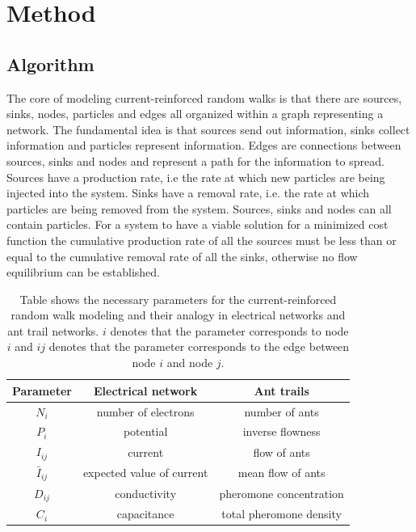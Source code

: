 \section{Method}
\label{sec:method}
\subsection{Algorithm}
The core of modeling current-reinforced random walks is that there are sources, sinks, nodes, particles and edges all organized within a graph representing a network. The fundamental idea is that sources send out information, sinks collect information and particles represent information. Edges are connections between sources, sinks and nodes and represent a path for the information to spread. Sources have a production rate, i.e the rate at which new particles are being injected into the system. Sinks have a removal rate, i.e. the rate at which particles are being removed from the system. Sources, sinks and nodes can all contain particles. For a system to have a viable solution for a minimized cost function the cumulative production rate of all the sources must be less than or equal to the cumulative removal rate of all the sinks, otherwise no flow equilibrium can be established.

\begin{table}[H]
\centering
\caption{Table shows the necessary parameters for the current-reinforced random walk modeling and their analogy in electrical networks and ant trail networks. $i$ denotes that the parameter corresponds to node $i$ and $ij$ denotes that the parameter corresponds to the edge between node $i$ and node $j$.}
\label{tab:parameters_short}
\begin{tabular}{ c | c | c }                       
	\textbf{Parameter} & \textbf{Electrical network} & \textbf{Ant trails} \\
	\hline
	$N_{i}$ & number of electrons & number of ants \\
	\hline
	$P_{i}$ & potential & inverse flowness \\
	\hline
	$I_{ij}$ & current & flow of ants \\
	\hline
	$\bar{I}_{ij}$ & expected value of current & mean flow of ants \\
	\hline
	$D_{ij}$ & conductivity & pheromone concentration \\
	\hline
	$C_{i}$ & capacitance & total pheromone density \\
\end{tabular} 
\end{table}

